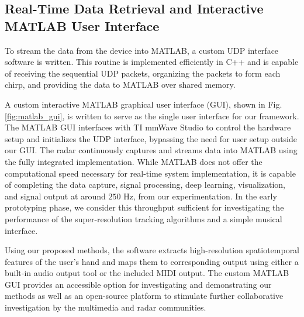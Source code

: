 \documentclass[10pt,journal,final]{IEEEtran}
\begin{document}
\subsection{Real-Time Data Retrieval and Interactive MATLAB User Interface}
\label{subsec:real_time_data_retrieval_and_MATLAB_interface}
To stream the data from the device into MATLAB, a custom UDP interface software is written. 
This routine is implemented efficiently in C++ and is capable of receiving the sequential UDP packets, organizing the packets to form each chirp, and providing the data to MATLAB over shared memory. 

A custom interactive MATLAB graphical user interface (GUI), shown in Fig. \ref{fig:matlab_gui}, is written to serve as the single user interface for our framework. 
The MATLAB GUI interfaces with TI mmWave Studio \cite{TI:mmWave_Studio} to control the hardware setup and initializes the UDP interface, bypassing the need for user setup outside our GUI.
The radar continuously captures and streams data into MATLAB using the fully integrated implementation. 
While MATLAB does not offer the computational speed necessary for real-time system implementation, it is capable of completing the data capture, signal processing, deep learning, visualization, and signal output at around $250$ Hz, from our experimentation. 
In the early prototyping phase, we consider this throughput sufficient for investigating the performance of the super-resolution tracking algorithms and a simple musical interface.

Using our proposed methods, the software extracts high-resolution spatiotemporal features of the user's hand and maps them to corresponding output using either a built-in audio output tool or the included MIDI output.
The custom MATLAB GUI provides an accessible option for investigating and demonstrating our methods as well as an open-source platform to stimulate further collaborative investigation by the multimedia and radar communities. 
\end{document}

